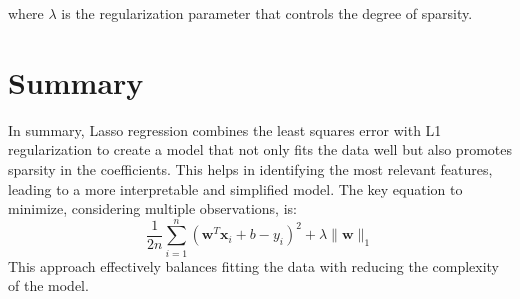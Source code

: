 \documentclass{article}
\begin{document}
where $\lambda$ is the regularization parameter that controls the degree of sparsity.

\section*{Summary}

In summary, Lasso regression combines the least squares error with L1 regularization to create a model that not only fits the data well but also promotes sparsity in the coefficients. This helps in identifying the most relevant features, leading to a more interpretable and simplified model. The key equation to minimize, considering multiple observations, is:
\[
\frac{1}{2n} \sum_{i=1}^n (\mathbf{w}^T \mathbf{x}_i + b - y_i)^2 + \lambda \|\mathbf{w}\|_1
\]
This approach effectively balances fitting the data with reducing the complexity of the model.
\end{document}
